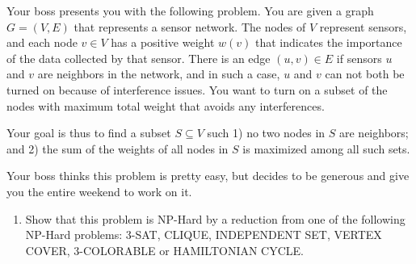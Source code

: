 \documentclass[11pt]{article}
\newcommand{\ans}[1]{}
\begin{document}
\begin{enumerate}
\begin{enumerate}
\ans{If there is no flow of size $m$, then there is a cut of capacity less than $m$ in the graph.  This gives a set $P$ of poodles such that the quota of the set of debs, $D(P)$ they are willing to be adopted by is smaller than the set $P$.  Thus, the set $P$ and $D(P)$ is a proof that no assignment is possible.}

\end{enumerate}




Your boss presents you with the following problem.  You are given a graph $G = (V,E)$ that represents a sensor network.  The nodes of $V$ represent sensors, and each node $v \in V$ has a positive weight $w(v)$ that indicates the importance of the data collected by that sensor.  There is an edge $(u,v) \in E$ if sensors $u$ and $v$ are neighbors in the network, and in such a case, $u$ and $v$ can not both be turned on because of interference issues.  You want to turn on a subset of the nodes with maximum total weight that avoids any interferences.

Your goal is thus to find a subset $S \subseteq V$ such 1) no two nodes in $S$ are neighbors; and 2) the sum of the weights of all nodes in $S$ is maximized among all such sets.

Your boss thinks this problem is pretty easy, but decides to be generous and give you the entire weekend to work on it.

\begin{enumerate}

\item Show that this problem is NP-Hard by a reduction from one of the following NP-Hard problems: 3-SAT, CLIQUE,  INDEPENDENT SET, VERTEX COVER, 3-COLORABLE or HAMILTONIAN CYCLE.
\ans{This is NP-Hard by a reduction from INDEPENDENT-SET.  Let $G=(V,E)$, $k$ be an INDEPENDENT-SET problem.  Imagine we have an algorithm, A, that can solve the above problem.  Then assign weight $1$ to each node in $V$ and feed this problem to algorithm $A$.  $G$ has an independent set of size $k$ iff $A$ returns a set $S$ with total weight at least $k$.} \ \\ \ \\ \ \\ \ \\ \ \\ \ \\ \ \\ \ \\ \ \\ \ \\ \ \\


\end{enumerate}
\end{enumerate}
\end{document}
